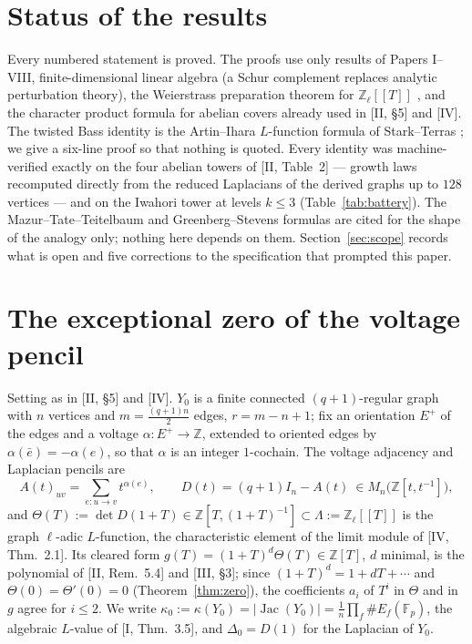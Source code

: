 \documentclass[11pt]{amsart}
\numberwithin{equation}{section}
\theoremstyle{definition}
\theoremstyle{remark}
\newcommand{\Z}{\mathbb{Z}}
\newcommand{\F}{\mathbb{F}}
\newcommand{\Zl}{\Z_\ell}
\newcommand{\La}{\Lambda}
\newcommand{\Jac}{\operatorname{Jac}}
\begin{document}
\maketitle

\section*{Status of the results}

Every numbered statement is proved. The proofs use only results of Papers I--VIII,
finite-dimensional linear algebra (a Schur complement replaces analytic perturbation
theory), the Weierstrass preparation theorem for $\Zl[[T]]$ \cite{Wa}, and the character
product formula for abelian covers already used in [II, \S5] and [IV]. The twisted Bass
identity is the Artin--Ihara $L$-function formula of Stark--Terras \cite{ST}; we give a
six-line proof so that nothing is quoted. Every identity was machine-verified exactly
on the four abelian towers of [II, Table~2] --- growth laws recomputed directly from the
reduced Laplacians of the derived graphs up to $128$ vertices --- and on the Iwahori tower
at levels $k\le3$ (Table~\ref{tab:battery}). The Mazur--Tate--Teitelbaum \cite{MTT} and
Greenberg--Stevens \cite{GS} formulas are cited for the shape of the analogy only;
nothing here depends on them. Section~\ref{sec:scope} records what is open and five
corrections to the specification that prompted this paper.

\section{The exceptional zero of the voltage pencil}\label{sec:zero}

Setting as in [II, \S5] and [IV]. $Y_0$ is a finite connected $(q{+}1)$-regular graph
with $n$ vertices and $m=\frac{(q+1)n}2$ edges, $r=m-n+1$; fix an orientation $E^+$ of
the edges and a voltage $\alpha\colon E^+\to\Z$, extended to oriented edges by
$\alpha(\bar e)=-\alpha(e)$, so that $\alpha$ is an integer $1$-cochain. The voltage
adjacency and Laplacian pencils are
\[
A(t)_{uv}=\sum_{e\colon u\to v}t^{\alpha(e)},\qquad
D(t)=(q{+}1)I_n-A(t)\ \in M_n\bigl(\Z[t,t^{-1}]\bigr),
\]
and $\Theta(T):=\det D(1+T)\in\Z[T,(1+T)^{-1}]\subset\La:=\Zl[[T]]$ is the graph
$\ell$-adic $L$-function, the characteristic element of the limit module of
[IV, Thm.~2.1]. Its cleared form $g(T)=(1+T)^{d}\Theta(T)\in\Z[T]$, $d$ minimal, is the
polynomial of [II, Rem.~5.4] and [III, \S3]; since $(1+T)^{d}=1+dT+\cdots$ and
$\Theta(0)=\Theta'(0)=0$ (Theorem~\ref{thm:zero}), the coefficients
$a_i$ of $T^{i}$ in $\Theta$ and in $g$ agree for $i\le2$. We write
$\kappa_0:=\kappa(Y_0)=|\Jac(Y_0)|=\frac1n\prod_f\#E_f(\F_p)$, the algebraic $L$-value
of [I, Thm.~3.5], and $\Delta_0=D(1)$ for the Laplacian of $Y_0$.
\end{document}
